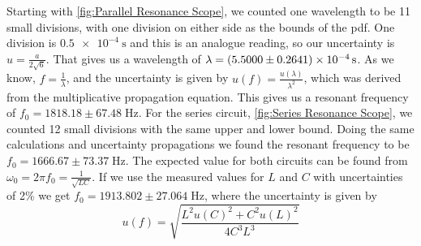 \documentclass[12pt]{article}
\numberwithin{equation}{section}
\numberwithin{figure}{section}
\begin{document}
    \newline
    \newline
    Starting with \autoref{fig:Parallel Resonance Scope}, we counted one wavelength to be 11 small 
    divisions, with one division on either side as the bounds of the pdf. One division is 
    $\SI{0.5e-4}{\second}$ and this is an analogue reading, so our uncertainty is 
    $u=\frac{a}{2\sqrt{6}}$. That gives us a wavelength of $\lambda=\SI{5.5\pm0.2641e-4}{\second}$. 
    As we know, $f=\frac{1}{\lambda}$, and the uncertainty is given by 
    $u(f)=\frac{u(\lambda)}{\lambda^2}$, which was derived from the multiplicative propagation 
    equation. This gives us a resonant frequency of $f_0=1818.18\pm67.48\;\si{\hertz}$. \newline
    \newline
    For the series circuit, \autoref{fig:Series Resonance Scope}, we counted 12 small divisions 
    with the same upper and lower bound. Doing the same calculations and uncertainty propagations 
    we found the resonant frequency to be $f_0=1666.67\pm73.37\;\si{\hertz}$. The expected value for 
    both circuits can be found from $\omega_0=2\pi f_0=\frac{1}{\sqrt{LC}}$. If we use the measured 
    values for $L$ and $C$ with uncertainties of 2\% we get $f_0=1913.802\pm27.064\;\si{\hertz}$, 
    where the uncertainty is given by
    \begin{equation*}
        u(f)=\sqrt{\frac{L^2u(C)^2+C^2u(L)^2}{4C^3L^3}}
    \end{equation*} 
\end{document}
